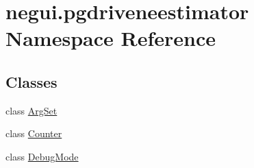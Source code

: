 \hypertarget{namespacenegui_1_1pgdriveneestimator}{}\section{negui.\+pgdriveneestimator Namespace Reference}
\label{namespacenegui_1_1pgdriveneestimator}
\subsection*{Classes}
\begin{DoxyCompactItemize}
\item 
class \hyperlink{classnegui_1_1pgdriveneestimator_1_1ArgSet}{Arg\+Set}
\item 
class \hyperlink{classnegui_1_1pgdriveneestimator_1_1Counter}{Counter}
\item 
class \hyperlink{classnegui_1_1pgdriveneestimator_1_1DebugMode}{Debug\+Mode}
\end{DoxyCompactItemize}

